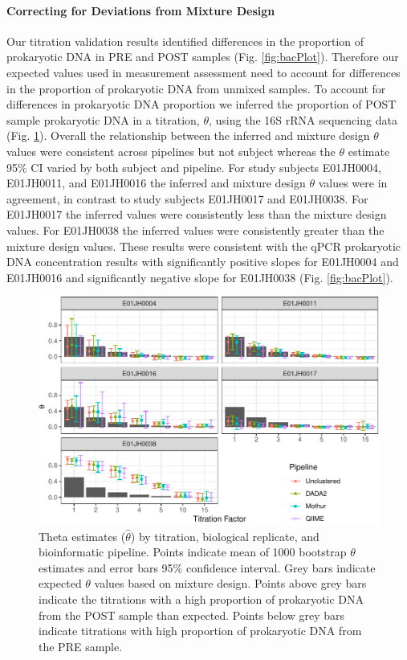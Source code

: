 \documentclass[linenumbers]{bmcart}
\begin{document}
\paragraph*{Correcting for Deviations from Mixture Design}

Our titration validation results identified differences in the proportion of prokaryotic DNA in PRE and POST samples (Fig. \ref{fig:bacPlot}).
Therefore our expected values used in measurement assessment need to account for differences in the proportion of prokaryotic DNA from unmixed samples.
To account for differences in prokaryotic DNA proportion we inferred
the proportion of POST sample prokaryotic DNA in a titration, \(\theta\), using
the 16S rRNA sequencing data (Fig. \ref{fig:thetaHat}). Overall the relationship
between the inferred and mixture design \(\theta\) values were
consistent across pipelines but not subject whereas the \(\theta\)
estimate 95\% CI varied by both subject and pipeline. For study subjects
E01JH0004, E01JH0011, and E01JH0016 the inferred and mixture design
\(\theta\) values were in agreement, in contrast to study subjects
E01JH0017 and E01JH0038. For E01JH0017 the inferred values were
consistently less than the mixture design values. For E01JH0038
the inferred values were consistently greater than the mixture design
values. These results were consistent with the qPCR prokaryotic DNA
concentration results with significantly positive slopes for E01JH0004
and E01JH0016 and significantly negative slope for E01JH0038 (Fig.
\ref{fig:bacPlot}).

\begin{figure}
\centering
\includegraphics{thetaHat-1.pdf}
\caption{\label{fig:thetaHat}Theta estimates (\(\hat{\theta}\)) by titration, biological
replicate, and bioinformatic pipeline. Points indicate mean
of 1000 bootstrap \(\theta\) estimates and error bars 95\% confidence
interval. Grey bars indicate expected \(\theta\) values based on mixture design.
Points above grey bars indicate the titrations with a high proportion of prokaryotic DNA from the POST sample than expected. Points below grey bars indicate titrations with high proportion of prokaryotic DNA from the PRE sample.}
\end{figure}
\end{document}
